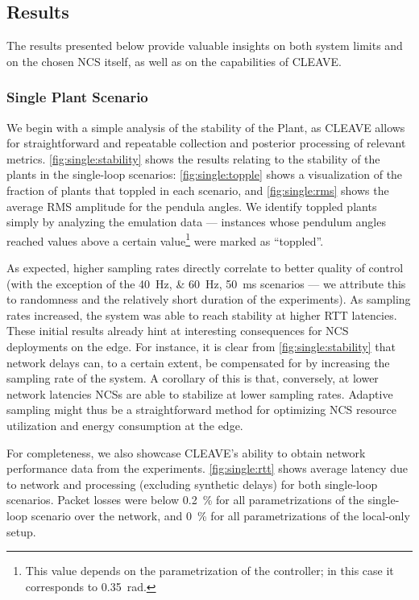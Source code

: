 \subsection{Results}\label{ssec:results}

The results presented below provide valuable insights on both system limits and on the chosen \ac{NCS} itself, as well as on the capabilities of \ac{CLEAVE}.

\subsubsection{Single Plant Scenario}

We begin with a simple analysis of the stability of the Plant, as \ac{CLEAVE} allows for straightforward and repeatable collection and posterior processing of relevant metrics.  
\cref{fig:single:stability} shows the results relating to the stability of the plants in the single-loop scenarios:
\cref{fig:single:topple} shows a visualization of the fraction of plants that toppled in each scenario, and \cref{fig:single:rms} shows the average \ac{RMS} amplitude for the pendula angles.
We identify toppled plants simply by analyzing the emulation data --- instances whose pendulum angles reached values above a certain value\footnote{This value depends on the parametrization of the controller; in this case it corresponds to \SI{0.35}{\radian}.} were marked as ``toppled''.

As expected, higher sampling rates directly correlate to better quality of control (with the exception of the \SIlist{40;60}{\hertz}, \SI{50}{\milli\second} scenarios --- we attribute this to randomness and the relatively short duration of the experiments).
As sampling rates increased, the system was able to reach stability at higher \ac{RTT} latencies.
These initial results already hint at interesting consequences for \ac{NCS} deployments on the edge.
For instance, it is clear from \cref{fig:single:stability} that network delays can, to a certain extent, be compensated for by increasing the sampling rate of the system.
A corollary of this is that, conversely, at lower network latencies \acp{NCS} are able to stabilize at lower sampling rates.
Adaptive sampling might thus be a straightforward method for optimizing \ac{NCS} resource utilization and energy consumption at the edge.

For completeness, we also showcase \ac{CLEAVE}'s ability to obtain network performance data from the experiments.
\cref{fig:single:rtt} shows average latency due to network and processing (excluding synthetic delays) for both single-loop scenarios.
Packet losses were below \SI{0.2}{\percent} for all parametrizations of the single-loop scenario over the network, and \SI{0}{\percent} for all parametrizations of the local-only setup.

